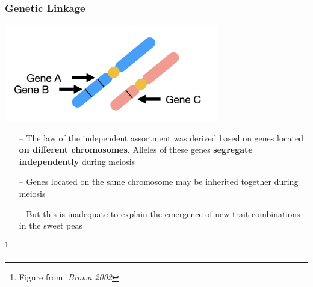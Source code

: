 \documentclass{beamer}
\newcommand\blfootnote[1]{%
	\begingroup
	\renewcommand\thefootnote{}\footnote{#1}%
	\addtocounter{footnote}{-1}%
	\endgroup
}
\begin{document}
\begin{frame}


	
	\frametitle{Genetic Linkage}
	
	\centering 				\includegraphics[keepaspectratio, width  =0.7\textwidth]{img/linkageCartoon} \\
	
\small 
\begin{itemize}
		\item[--] The law of the independent assortment was derived based on genes located\textbf{ on different chromosomes}. Alleles of these genes \textbf{segregate independently }during meiosis \pause

		\item[--] Genes located on the same chromosome may be inherited together during meiosis \pause
		
		\item[--] But this is inadequate to explain the emergence of new trait combinations in the sweet peas
		
	\end{itemize}
\blfootnote{Figure from:\textit{ Brown 2002}}
\end{frame}
		
		
		
		
		
\end{document}
